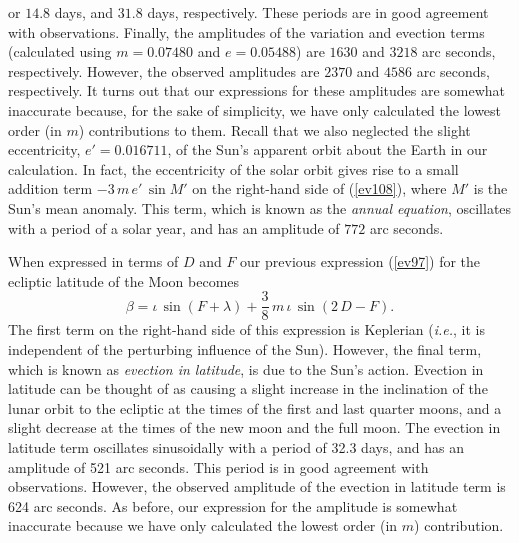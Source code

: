  or $14.8$ days, and $31.8$ days, respectively. These periods are in good agreement with observations.
 Finally, the amplitudes of the variation and evection terms  (calculated using $m=0.07480$ and $e=0.05488$)
 are $1630$ and $3218$ arc seconds, respectively. However, the observed amplitudes are 
 $2370$ and $4586$ arc seconds, respectively. It turns out that our expressions for these amplitudes  are somewhat inaccurate because, for the
 sake of simplicity, we have only calculated the lowest order (in $m$) contributions to them. Recall that we  also
 neglected the slight eccentricity, $e'=0.016711$, of the Sun's apparent orbit about the
Earth in our calculation. In fact, the eccentricity of the solar orbit gives rise to a small addition term $-3\,m\,e'\,\sin M'$ on the right-hand side of (\ref{ev108}),
where $M'$ is the Sun's mean anomaly. This term, which is known as the {\em annual equation}, oscillates with a period
of a solar year, and has an amplitude of $772$ arc seconds. 

When expressed in terms of $D$ and $F$ our previous expression (\ref{ev97}) for the ecliptic latitude of the Moon
becomes
\begin{equation}
\beta = \iota\,\sin(F+\lambda) + \frac{3}{8}\,m\,\iota\,\sin(2\,D-F).
\end{equation}
The first term on the right-hand side of this expression is Keplerian ({\em i.e.}, it is independent of the perturbing
influence of the Sun). However, the final term, which is known as {\em evection in latitude}, is due to the
Sun's action. Evection in latitude can be thought of as causing a slight increase in the inclination of the lunar orbit
to the ecliptic at the times of the first and last quarter moons, and a slight decrease at the times of the new moon and
the full moon. The evection in latitude term oscillates sinusoidally with a period of 32.3 days, and has
an amplitude of 521 arc seconds. This period is in good agreement with observations. However, the observed
amplitude of the evection in latitude term is 624 arc seconds.  As before, our expression for the amplitude  is somewhat inaccurate because we have only calculated the lowest order (in $m$) contribution.